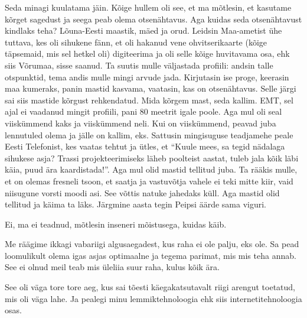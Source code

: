 Seda minagi kuulatama jäin. Kõige hullem oli see, et ma mõtlesin, et kasutame kõrget sagedust ja seega peab olema otsenähtavus. Aga kuidas seda otsenähtavust kindlaks teha?  Lõuna-Eesti maastik, mäed ja orud. Leidsin Maa-ametist ühe tuttava, kes oli sihukene fänn, et oli hakanud vene ohvitserikaarte (kõige täpsemaid, mis sel hetkel oli) digiteerima ja oli selle kõige huvitavama osa, ehk siis Võrumaa,  sisse saanud. Ta suutis mulle väljastada  profiili: andsin talle otspunktid, tema andis mulle mingi arvude jada. Kirjutasin ise proge, keerasin maa kumeraks, panin mastid kasvama, vaatasin, kas on otsenähtavus. Selle järgi sai siis  mastide kõrgust rehkendatud. Mida kõrgem mast, seda kallim. EMT, sel ajal ei vaadanud mingit profiili, pani 80 meetrit igale poole. Aga mul oli seal viiskümmend kaks ja viiskümmend neli. Kui on viiskümmend, peavad juba lennutuled olema ja jälle on kallim, eks. Sattusin mingisuguse teadjamehe peale Eesti Telefonist, kes vaatas tehtut ja ütles, et \enquote{Kuule mees, sa tegid nädalaga sihukese asja? Trassi projekteerimiseks läheb poolteist aastat, tuleb jala kõik läbi käia, puud ära kaardistada!}. Aga mul olid mastid tellitud juba. Ta rääkis mulle, et on olemas fresneli tsoon, et saatja ja vastuvõtja vahele ei teki mitte kiir, vaid niisugune vorsti moodi asi. See võttis natuke jahedaks küll. Aga mastid olid tellitud ja käima ta läks. Järgmine aasta tegin Peipsi äärde sama viguri. 


Ei, ma ei teadnud,  mõtlesin inseneri mõistusega, kuidas käib. 


Me räägime ikkagi vabariigi algusaegadest, kus raha ei ole palju, eks ole. Sa pead loomulikult olema igas asjas optimaalne ja tegema parimat, mis mis teha annab. See ei olnud meil teab mis üleliia suur raha, kulus kõik ära. 

See oli väga tore tore aeg, kus sai tõesti käegakatsutavalt riigi arengut toetatud, mis oli väga lahe. Ja pealegi minu lemmiktehnoloogia ehk siis internetitehnoloogia osas. 


